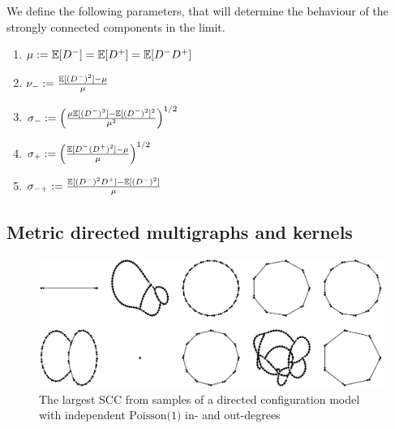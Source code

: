 We define the following parameters, that will determine the behaviour of the strongly connected components in the limit.
\begin{enumerate}
    \item $\mu:={\mathbb E}[D^-]={\mathbb E}[D^+]={\mathbb E}[D^-D^+]$
    \item $\nu_-:=\frac{{\mathbb E}[(D^-)^2]-\mu}{\mu}$ 
    \item $\sigma_-:=\left(\frac{\mu{\mathbb E}[(D^-)^3]-{\mathbb E}[(D^-)^2]^2}{\mu^2}\right)^{1/2}$ 
    \item $\sigma_+:=\left(\frac{{\mathbb E}[D^-(D^+)^2]-\mu}{\mu}\right)^{1/2}$ 
    \item $\sigma_{-+}:=\frac{{\mathbb E}[(D^-)^2D^+]-{\mathbb E}[(D^-)^2]}{\mu}$ 
\end{enumerate}
\subsection{Metric directed multigraphs and kernels}

\begin{figure}[htbp]
    \centering

    \includegraphics[width=\textwidth]{Content/Pictures/largest_sccs.eps}
    
    \caption{The largest SCC from samples of a directed configuration model with independent $\text{Poisson(1)}$ in- and out-degrees}
    \label{fig:largest-sccs}
\end{figure}

